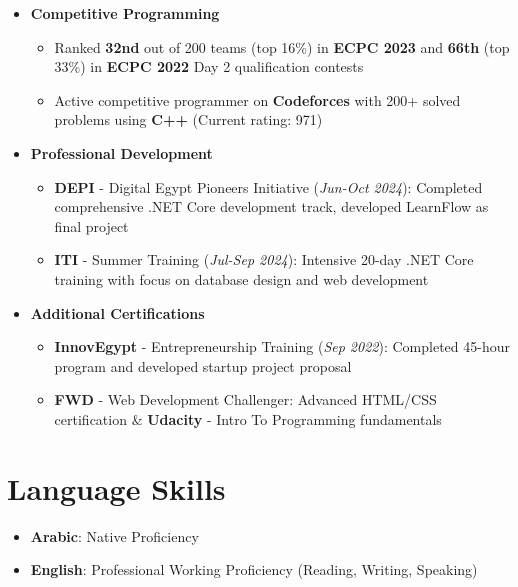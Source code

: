 \documentclass[letterpaper,11pt]{article}
\newcommand{\resumeItem}[1]{
  \item\small{
    {#1 \vspace{-2pt}}
  }
}
\newcommand{\resumeItemListStart}{\begin{itemize}}
\newcommand{\resumeItemListEnd}{\end{itemize}\vspace{-5pt}}
\begin{document}
\begin{itemize}
    \item \textbf{Competitive Programming}
        \resumeItemListStart
            \resumeItem{Ranked \textbf{32nd} out of 200 teams (top 16\%) in \textbf{ECPC 2023} and \textbf{66th} (top 33\%) in \textbf{ECPC 2022} Day 2 qualification contests}
            \resumeItem{Active competitive programmer on \textbf{Codeforces} with 200+ solved problems using \textbf{C++} (Current rating: 971)}
        \resumeItemListEnd
    
    \item \textbf{Professional Development}
        \resumeItemListStart
            \resumeItem{\textbf{DEPI} - Digital Egypt Pioneers Initiative (\textit{Jun-Oct 2024}): Completed comprehensive .NET Core development track, developed LearnFlow as final project}
            \resumeItem{\textbf{ITI} - Summer Training (\textit{Jul-Sep 2024}): Intensive 20-day .NET Core training with focus on database design and web development}
        \resumeItemListEnd
    
    \item \textbf{Additional Certifications}
        \resumeItemListStart
            \resumeItem{\textbf{InnovEgypt} - Entrepreneurship Training (\textit{Sep 2022}): Completed 45-hour program and developed startup project proposal}
            \resumeItem{\textbf{FWD} - Web Development Challenger: Advanced HTML/CSS certification \& \textbf{Udacity} - Intro To Programming fundamentals}
        \resumeItemListEnd
\end{itemize}
\vspace{-5pt}

\section{\LARGE Language Skills}
\vspace{10pt}

\begin{itemize}
  \item \textbf{Arabic}: Native Proficiency
  \item \textbf{English}: Professional Working Proficiency (Reading, Writing, Speaking)
\end{itemize}
\vspace{-5pt}
 
\end{document}
